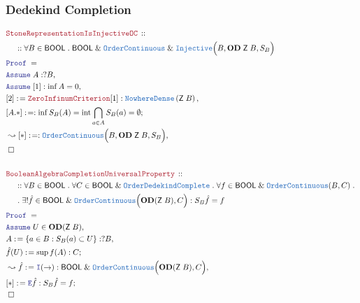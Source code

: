 \documentclass[12pt]{scrartcl}
\newcommand{\TYPE}[1]{\textcolor{NavyBlue}{\mathtt{#1}}}
\newcommand{\LOGIC}[1]{\textcolor{Blue}{\mathtt{#1}}}
\newcommand{\THM}[1]{\textcolor{Maroon}{\mathtt{#1}}}
\renewcommand{\.}{\; . \;}
\newcommand{\de}{: \kern 0.1pc =}
\newcommand{\Theorem}[2]{& \THM{#1} \, :: \, #2 \\ & \Proof = \\ }
\newcommand{\NewLine}{\\ & \kern 1pc}
\newcommand{\Page}[1]{ \begin{align*} #1 \end{align*}   }
\renewcommand{\And}{\; \& \;}
\newcommand{\Intro}{\LOGIC{I}}
\newcommand{\Elim}{\LOGIC{E}}
\newcommand{\Say}[3]{& #1 \de #2 : #3, \\}
\newcommand{\Conclude}[3]{& #1 \de #2 : #3; \\}
\newcommand{\Derive}[3]{& \leadsto #1 \de #2 : #3, \\}
\newcommand{\Assume}[2]{& \LOGIC{Assume} \; #1 : #2, \\}
\newcommand{\AssumeIn}[2]{& \LOGIC{Assume} \; #1 \in #2, \\}
\newcommand{\QED}{\; \square}
\newcommand{\EndProof}{& \QED \\}
\newcommand{\Proof}{\LOGIC{Proof} \; }
\newcommand{\ND}{\TYPE{NowhereDense}}
\DeclareMathOperator*{\intx}{int}
\newcommand{\oC}{\TYPE{OrderContinuous}}
\newcommand{\OComplete}{\TYPE{OrderDedekindComplete}}
\newcommand{\od}{\mathbf{OD}}
\newcommand{\BOOL}{\mathsf{BOOL}}
\newcommand{\Z}{\mathsf{Z}}
\begin{document}
\subsubsection{Dedekind Completion}
\Page{
	\Theorem{StoneRepresentationIsInjectiveOC}
	{
		\NewLine ::		
		\forall B \in \BOOL \.
		\BOOL \And \oC \And \TYPE{Injective}\Big( B, \od \; \Z \; B, S_B \Big)
	}
	\Assume{A}{?B}
	\Assume{[1]}{\inf A  = 0 }
	\Say{[2]}{\THM{ZeroInfinumCriterion}[1]}{\ND\left(\Z \; B \right)}
	\Conclude{[A.*]}{}{\inf S_B(A) = \intx \bigcap_{a \in A} S_B(a) = \emptyset}
	\Derive{[*]}{}{\oC\Big( B, \od \; \Z \; B,S_B\Big)}
	\EndProof
	\\
	\Theorem{BooleanAlgebraCompletionUniversalProperty}
	{
		\NewLine ::		
		\forall B \in \BOOL \.
		\forall C \in \BOOL \And \OComplete \.
		\forall f \in \BOOL \And \oC(B,C) \. \NewLine \.
		\exists! {\hat f} \in \BOOL \And \oC\Big( \od(\Z \; B  ), C \Big) :
		S_B{\hat f} = f
	}
	\AssumeIn{U}{\od(\Z \; B)}
	\Say{A}{\{ a \in B : S_B(a) \subset U \}}{?B}
	\Conclude{{\hat f}(U)}{ \sup f(A)}{C}
	\Derive{\hat f}{\Intro(\to)}
	{
		\BOOL\And \oC\Big(\od(\Z\;B),C\Big)
	}
	\Conclude{[*]}{\Elim {\hat f}}
	{
		S_B {\hat f} = f
	}
	\EndProof
}
\newpage
\end{document}
